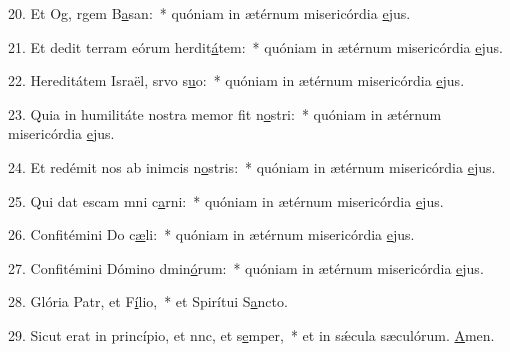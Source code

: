 20. Et Og, rgem B\uline{a}san:~* quóniam in ætérnum misericórdia \uline{e}jus.\par 
21. Et dedit terram eórum herdit\uline{á}tem:~* quóniam in ætérnum misericórdia \uline{e}jus.\par 
22. Hereditátem Israël, srvo s\uline{u}o:~* quóniam in ætérnum misericórdia \uline{e}jus.\par 
23. Quia in humilitáte nostra memor fit n\uline{o}stri:~* quóniam in ætérnum misericórdia \uline{e}jus.\par 
24. Et redémit nos ab inimcis n\uline{o}stris:~* quóniam in ætérnum misericórdia \uline{e}jus.\par 
25. Qui dat escam mni c\uline{a}rni:~* quóniam in ætérnum misericórdia \uline{e}jus.\par 
26. Confitémini Do c\uline{æ}li:~* quóniam in ætérnum misericórdia \uline{e}jus.\par 
27. Confitémini Dómino dmin\uline{ó}rum:~* quóniam in ætérnum misericórdia \uline{e}jus.\par 
28. Glória Patr, et F\uline{í}lio,~* et Spirítui S\uline{a}ncto.\par 
29. Sicut erat in princípio, et nnc, et s\uline{e}mper,~* et in sǽcula sæculórum. \uline{A}men.\par 

